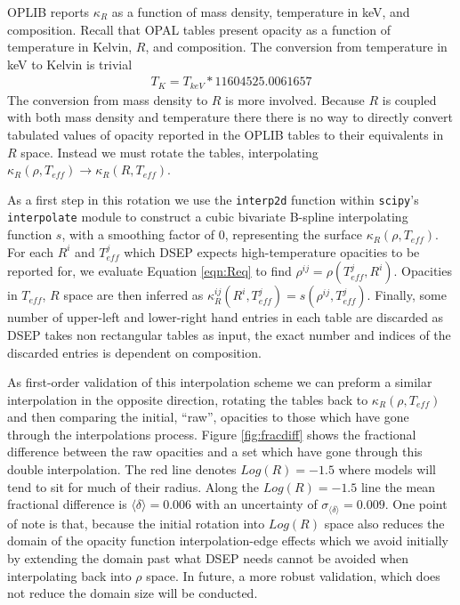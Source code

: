 OPLIB reports $\kappa_{R}$ as a function of mass density, temperature in keV,
and composition. Recall that OPAL tables present opacity as a function of
temperature in Kelvin, $R$, and composition. The conversion from temperature
in keV to Kelvin is trivial
\begin{align}
	T_{K} = T_{keV} * 11604525.0061657
\end{align}
The conversion from mass density to $R$ is more involved. Because $R$ is
coupled with both mass density and temperature there there is no way to
directly convert tabulated values of opacity reported in the OPLIB tables to
their equivalents in $R$ space. Instead we must rotate the tables,
interpolating $\kappa_{R}(\rho,T_{eff}) \rightarrow \kappa_{R}(R,T_{eff})$. 

As a first step in this rotation we use the \texttt{interp2d} function within
\texttt{scipy}'s \texttt{interpolate} \citep{2020SciPy-NMeth} module to
construct a cubic bivariate B-spline \citep{Dierckx1981} interpolating function
$s$, with a smoothing factor of 0, representing the surface $\kappa_{R}(\rho,
T_{eff})$. For each $R^{i}$ and $T^{j}_{eff}$ which DSEP expects
high-temperature opacities to be reported for, we evaluate Equation
\ref{eqn:Req} to find $\rho^{ij} = \rho(T^{j}_{eff},R^{i})$.  Opacities in
$T_{eff}$, $R$ space are then inferred as $\kappa^{ij}_{R}(R^{i},T^{j}_{eff}) =
s(\rho^{ij}, T^{j}_{eff})$. Finally, some number of upper-left and lower-right
hand entries in each table are discarded as DSEP takes non rectangular tables
as input, the exact number and indices of the discarded entries is dependent
on composition.

As first-order validation of this interpolation scheme we can preform a similar
interpolation in the opposite direction, rotating the tables back to
$\kappa_{R}(\rho, T_{eff})$ and then comparing the initial, ``raw'', opacities
to those which have gone through the interpolations process. Figure
\ref{fig:fracdiff} shows the fractional difference between the raw opacities
and a set which have gone through this double interpolation. The red line
denotes $Log(R)=-1.5$ where models will tend to sit for much of their radius.
Along the $Log(R)=-1.5$ line the mean fractional difference is $\langle \delta
\rangle = 0.006$ with an uncertainty of $\sigma_{\langle\delta\rangle} =
0.009$. One point of note is that, because the initial rotation into $Log(R)$
space also reduces the domain of the opacity function interpolation-edge
effects which we avoid initially by extending the domain past what DSEP needs
cannot be avoided when interpolating back into $\rho$ space. In future, a more
robust validation, which does not reduce the domain size will be conducted.

